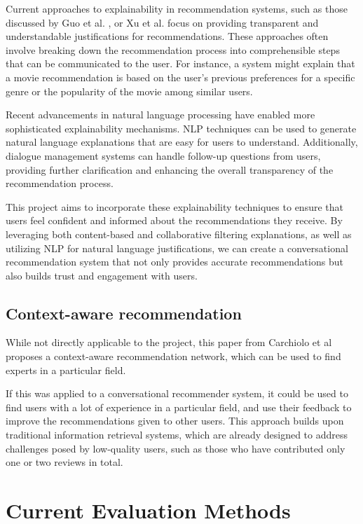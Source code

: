 Current approaches to explainability in recommendation systems, such as those discussed by Guo et al. \cite{Guo_2023}, or Xu et al. \cite{Tag_based_post_hoc} focus on providing transparent and understandable justifications for recommendations. These approaches often involve breaking down the recommendation process into comprehensible steps that can be communicated to the user. For instance, a system might explain that a movie recommendation is based on the user's previous preferences for a specific genre or the popularity of the movie among similar users.


Recent advancements in natural language processing have enabled more sophisticated explainability mechanisms. NLP techniques can be used to generate natural language explanations that are easy for users to understand. Additionally, dialogue management systems can handle follow-up questions from users, providing further clarification and enhancing the overall transparency of the recommendation process.

This project aims to incorporate these explainability techniques to ensure that users feel confident and informed about the recommendations they receive. By leveraging both content-based and collaborative filtering explanations, as well as utilizing NLP for natural language justifications, we can create a conversational recommendation system that not only provides accurate recommendations but also builds trust and engagement with users.

\subsection{Context-aware recommendation}
While not directly applicable to the project, this paper from Carchiolo et al\cite{CARCHIOLO20151086} proposes a context-aware recommendation network, which can be used to find experts in a particular field.

If this was applied to a conversational recommender system, it could be used to find users with a lot of experience in a particular field, and use their feedback to improve the recommendations given to other users.
This approach builds upon traditional information retrieval systems, which are already designed to address challenges posed by low-quality users, such as those who have contributed only one or two reviews in total.





\section{Current Evaluation Methods}
\label{sec:current_evaluation_methods}
